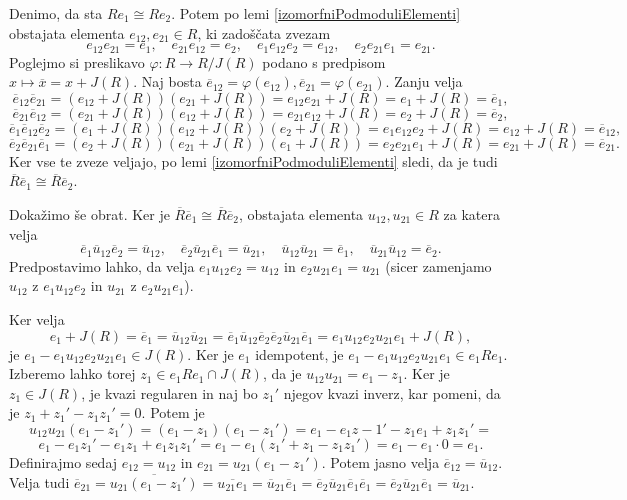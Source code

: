 \documentclass[a4paper, 12pt]{amsart}
\theoremstyle{definition} %
\theoremstyle{plain} %
\begin{document}
\proof
Denimo, da sta $R e_1 \cong Re_2$. Potem po lemi \ref{izomorfniPodmoduliElementi} obstajata elementa $e_{12}, e_{21} \in R$, ki zadoščata zvezam
$$
e_{12}e_{21} = e_1, \quad e_{21}e_{12} = e_2, \quad  e_1 e_{12} e_2 = e_{12}, \quad e_2 e_{21} e_1 = e_{21}.
$$
Poglejmo si preslikavo $\varphi: R\rightarrow R/J(R)$ podano s predpisom $x\mapsto \overline{x} = x+J(R)$. Naj bosta $\overline{e}_{12} = \varphi(e_{12}), \overline{e}_{21} = \varphi(e_{21})$. Zanju velja
$$
\overline{e}_{12} \overline{e}_{21} = (e_{12} + J(R))(e_{21} + J(R)) = e_{12} e_{21} + J(R) = e_1 + J(R) = \overline{e}_1,
$$
$$
\overline{e}_{21} \overline{e}_{12} = (e_{21} + J(R))(e_{12} + J(R)) = e_{21} e_{12} + J(R)  = e_2 + J(R) = \overline{e}_2,
$$
$$
\overline{e}_1 \overline{e}_{12} \overline{e}_2 = (e_1 + J(R)) (e_{12} + J(R)) (e_2 + J(R)) = e_1 e_{12} e_2 + J(R) = e_{12} + J(R) = \overline{e}_{12},
$$
$$
\overline{e}_2 \overline{e}_{21} \overline{e}_1 = (e_2 + J(R)) (e_{21} + J(R)) (e_1 + J(R)) = e_2 e_{21} e_1 + J(R) = e_{21} + J(R) = \overline{e}_{21}.
$$
Ker vse te zveze veljajo, po lemi \ref{izomorfniPodmoduliElementi} sledi, da je tudi $\overline{R} \overline{e}_1 \cong \overline{R}\overline{e}_2$.

Dokažimo še obrat. Ker je $\overline{R}\overline{e}_1 \cong \overline{R}\overline{e}_2$, obstajata elementa $u_{12},u_{21} \in R$ za katera velja 
$$
\overline{e}_1 \overline{u}_{12}\overline{e}_2 = \overline{u}_{12}, \quad \overline{e}_2 \overline{u}_{21} \overline{e}_1 = \overline{u}_{21}, \quad \overline{u}_{12}\overline{u}_{21} = \overline{e}_1, \quad \overline{u}_{21} \overline{u}_{12} = \overline{e}_2.
$$
Predpostavimo lahko, da velja $e_1 u_{12} e_2 = u_{12} $ in $e_2 u_{21} e_1 = u_{21}$ (sicer zamenjamo $u_{12}$ z $e_1 u_{12} e_2$ in $u_{21}$ z $e_2 u_{21} e_1$).

Ker velja 
$$
e_1 + J(R) = \overline{e}_1 = \overline{u}_{12} \overline{u}_{21} = \overline{e}_1 \overline{u}_{12} \overline{e}_2 \overline{e}_2 \overline{u}_{21} \overline{e}_1 = e_1 u_{12} e_2 u_{21} e_1 + J(R),
$$
je $e_1 - e_1 u_{12} e_2 u_{21} e_1 \in J(R)$. Ker je $e_1$ idempotent, je  $e_1 - e_1 u_{12} e_2 u_{21} e_1 \in e_1 R e_1$. Izberemo lahko torej $z_1 \in e_1Re_1 \cap J(R)$, da je $u_{12}u_{21} = e_1 - z_1$. Ker je $z_1\in J(R)$, je kvazi regularen in naj bo $z_1'$ njegov kvazi inverz, kar pomeni, da je $z_1 + z_1' - z_1 z_1' = 0$. Potem je 
$$
u_{12} u_{21} (e_1 - z_1') = (e_1 - z_1)(e_1 - z_1') = e_1 - e_1 z-1' - z_1 e_1 + z_1 z_1' = 
$$
$$
e_1 - e_1 z_1' - e_1 z_1 + e_1 z_1 z_1' = e_ 1 - e_1 (z_1' +z_1 - z_1 z_1') = e_1  - e_1 \cdot 0 = e_1.
$$
Definirajmo sedaj $e_{12} = u_{12} $ in $e_{21} = u_{21} (e_1 - z_1')$. Potem jasno velja $\overline{e}_{12} = \overline{u}_{12}$. Velja tudi $\overline{e}_{21} = \overline{u_{21}(e_1 - z_1')} = \overline{u_{21} e_1} = \overline{u}_{21} \overline{e}_1 = \overline{e}_2 \overline{u}_{21} \overline{e}_1 \overline{e}_1 =  \overline{e}_2 \overline{u}_{21} \overline{e}_1 = \overline{u}_{21}$.
\end{document}
